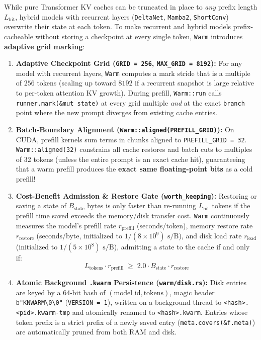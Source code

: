 \documentclass[10pt,a4paper]{article}
\theoremstyle{swzstyle}
\newcommand{\code}[1]{\texttt{#1}}
\begin{document}
While pure Transformer KV caches can be truncated in place to \emph{any} prefix length $L_{\text{hit}}$, hybrid models with recurrent layers (\code{DeltaNet}, \code{Mamba2}, \code{ShortConv}) overwrite their state at each token. To make recurrent and hybrid models prefix-cacheable without storing a checkpoint at every single token, \code{Warm} introduces \textbf{adaptive grid marking}:
\begin{enumerate}
  \item \textbf{Adaptive Checkpoint Grid (\code{GRID = 256}, \code{MAX\_GRID = 8192}):} For any model with recurrent layers, \code{Warm} computes a mark stride that is a multiple of $256$ tokens (scaling up toward $8192$ if a recurrent snapshot is large relative to per-token attention KV growth). During prefill, \code{Warm::run} calls \code{runner.mark(\&mut state)} at every grid multiple \emph{and} at the exact \code{branch} point where the new prompt diverges from existing cache entries.
  \item \textbf{Batch-Boundary Alignment (\code{Warm::aligned(PREFILL\_GRID)}):} On CUDA, prefill kernels sum terms in chunks aligned to \code{PREFILL\_GRID = 32}. \code{Warm::aligned(32)} constrains all cache restores and batch cuts to multiples of 32 tokens (unless the entire prompt is an exact cache hit), guaranteeing that a warm prefill produces the \textbf{exact same floating-point bits} as a cold prefill!
  \item \textbf{Cost-Benefit Admission \& Restore Gate (\code{worth\_keeping}):} Restoring or saving a state of $B_{\text{state}}$ bytes is only faster than re-running $L_{\text{hit}}$ tokens if the prefill time saved exceeds the memory/disk transfer cost. \code{Warm} continuously measures the model's prefill rate $r_{\text{prefill}}$ (seconds/token), memory restore rate $r_{\text{restore}}$ (seconds/byte, initialized to $1/(8\times 10^9)\text{ s/B}$), and disk load rate $r_{\text{load}}$ (initialized to $1/(5\times 10^8)\text{ s/B}$), admitting a state to the cache if and only if:
  \begin{equation}
    L_{\text{tokens}} \cdot r_{\text{prefill}} \;\ge\; 2.0 \cdot B_{\text{state}} \cdot r_{\text{restore}}
    \label{eq:warm_worth_keeping}
  \end{equation}
  \item \textbf{Atomic Background \code{.kwarm} Persistence (\code{warm/disk.rs}):} Disk entries are keyed by a 64-bit hash of $(\text{model\_id}, \text{tokens})$, magic header \code{b"KNWARM\textbackslash 0\textbackslash 0"} (\code{VERSION = 1}), written on a background thread to \code{<hash>.<pid>.kwarm-tmp} and atomically renamed to \code{<hash>.kwarm}. Entries whose token prefix is a strict prefix of a newly saved entry (\code{meta.covers(\&f.meta)}) are automatically pruned from both RAM and disk.
\end{enumerate}
\end{document}
